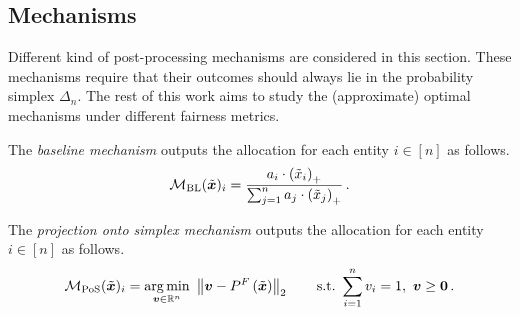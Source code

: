 \subsection*{Mechanisms}
Different kind of post-processing mechanisms are considered in this section. These mechanisms
require that
their outcomes should always lie in the probability simplex $\Delta_n$. The rest of this work aims to study the (approximate) optimal mechanisms under different fairness metrics.
\begin{definition}
	The \emph{baseline mechanism} outputs the allocation for each entity $i\in [n]$ as follows.
	\begin{equation*}
		\mathcal{M}_{\mathrm{BL}}(\tilde{\bm{x}})_i = \frac{a_i\cdot \left(\tilde{x}_i\right)_+}{\sum_{j=1}^n a_j\cdot \left(\tilde{x}_j\right)_+}\,.
	\end{equation*}
\end{definition}

\begin{definition}
	The \emph{projection onto simplex mechanism} outputs the allocation for each entity $i\in [n]$ as follows.
	\begin{equation*}
		\mathcal{M}_{\mathrm{PoS}}(\tilde{\bm{x}})_i= \underset{\bm{v}\in\mathbb{R}^n}{\arg\min}~\left\lVert\bm{v}-P^F\left(\tilde{\bm{x}}\right)\right\rVert_2\qquad\mathrm{s.t.}~
		\sum_{i=1}^n v_i = 1,~\bm{v}\geq \bm{0}\,.
	\end{equation*}
\end{definition}


